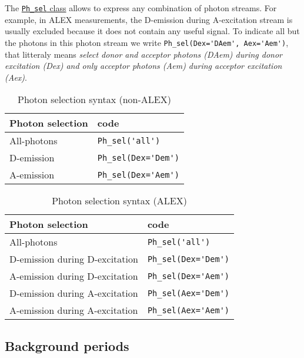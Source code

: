 The \href{http://fretbursts.readthedocs.org/en/latest/data_class.html#module-fretbursts.ph_sel}{\texttt{Ph\_sel} class} allows to express any combination of photon streams. 
For example, in ALEX measurements, the D-emission during A-excitation stream is usually excluded because it does not contain any useful signal\cite{Lee_2005}. To indicate all but the photons in this photon stream we write \verb|Ph_sel(Dex='DAem', Aex='Aem')|, that litteraly means \textit{select donor and acceptor photons (DAem) during donor excitation (Dex) and only acceptor photons (Aem) during acceptor excitation (Aex)}.

\begin{table}
\begin{tabular}{l|l}
  Photon selection  & code \\
  \hline
  All-photons       & \verb|Ph_sel('all')|\\
  D-emission    & \verb|Ph_sel(Dex='Dem')|\\
  A-emission & \verb|Ph_sel(Dex='Aem')|\\
\end{tabular}
\caption{\label{tab:ph_sel_smfret}Photon selection syntax (non-ALEX)}
\end{table}

\begin{table}
\begin{tabular}{l|l}
  Photon selection  & code \\
  \hline
  All-photons & \verb|Ph_sel('all')|\\
  D-emission during D-excitation & \verb|Ph_sel(Dex='Dem')|\\
  A-emission during D-excitation & \verb|Ph_sel(Dex='Aem')|\\
  D-emission during A-excitation & \verb|Ph_sel(Aex='Dem')|\\
  A-emission during A-excitation & \verb|Ph_sel(Aex='Aem')|\\
\end{tabular}
\caption{\label{tab:ph_sel_alex}Photon selection syntax (ALEX)}
\end{table}

\subsection{Background periods}
\label{sec:bg_intro}


